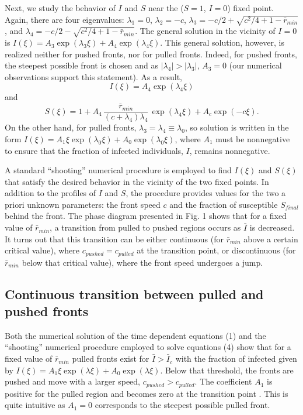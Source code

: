 \documentclass[pre,aps,twocolumn,showpacs]{revtex4}
\begin{document}
Next, we study the behavior of $I$ and $S$ near the ($S=1$, $I=0$) fixed point. Again, there are four eigenvalues: $\lambda_1 = 0$, $\lambda_2 = -c$, $\lambda_3 = -c/2 + \sqrt{c^2/4 + 1 -\bar{r}_{min}}$, and $\lambda_4 = -c/2 - \sqrt{c^2/4 + 1 -\bar{r}_{min}}$. The general solution in the vicinity of $I=0$ is $I(\xi) = A_3\exp(\lambda_3\xi) + A_4\exp(\lambda_4\xi)$. This general solution, however, is realized neither for pushed fronts, nor for pulled fronts. Indeed, for pushed fronts, the steepest possible front is chosen and as $|\lambda_4| > |\lambda_3|$, $A_3=0$ (our numerical observations support this statement). As a result, $$I(\xi) = A_4\exp(\lambda_4\xi)$$ and $$S(\xi) = 1 + A_4\,\frac{\bar{r}_{min}}{(c+\lambda_4)\lambda_4}\,\exp(\lambda_4\xi) + A_c\exp(-c\xi).$$ On the other hand, for pulled fronts, $\lambda_3 = \lambda_4 \equiv \lambda_0$, so solution is written in the form $I(\xi) = A_1 \xi\exp(\lambda_0\xi) + A_0 \exp(\lambda_0\xi)$, where $A_1$ must be nonnegative to ensure that the fraction of infected individuals, $I$, remains nonnegative.

A standard “shooting” numerical procedure is employed to find $I(\xi)$ and $S(\xi)$ that satisfy the desired behavior in the vicinity of the two fixed points. In addition to the profiles of $I$ and $S$, the procedure provides values for the two a priori unknown parameters: the front speed $c$ and the fraction of susceptible $S_{final}$ behind the front. The phase diagram presented in Fig. 1 shows that for a fixed value of $\bar{r}_{min}$, a transition from pulled to pushed regions occurs as $\bar{I}$ is decreased. It turns out that this transition can be either continuous (for $\bar{r}_{min}$ above a certain critical value), where $c_{pushed} = c_{pulled}$ at the transition point, or discontinuous (for $\bar{r}_{min}$ below that critical value), where the front speed undergoes a jump.

\subsection{Continuous transition between pulled and pushed fronts}

Both the numerical solution of the time dependent equations (1) and the “shooting” numerical procedure employed to solve equations (4) show that for a fixed value of $\bar{r}_{min}$ pulled fronts exist for $\bar{I} > \bar{I}_c$ with the fraction of infected given by $I(\xi) = A_1 \xi\exp(\lambda\xi) + A_0 \exp(\lambda\xi)$. Below that threshold, the fronts are pushed and move with a larger speed, $c_{pushed} > c_{pulled}$. The coefficient $A_1$ is positive for the pulled region and becomes zero at the transition point \cite{Saarloos}. This is quite intuitive as $A_1=0$ corresponds to the steepest possible pulled front.
\end{document}
